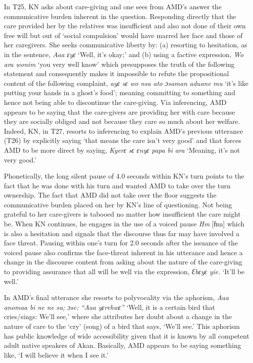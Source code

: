 \documentclass[output=paper,colorlinks,citecolor=brown]{langscibook}
\begin{document}
In T25, KN asks about care-giving and one sees from AMD’s answer the communicative burden inherent in the question. Responding directly that the care provided her by the relatives was insufficient and also not done of their own free will but out of ‘social compulsion’ would have marred her face and those of her caregivers. She seeks communicative liberty by: (a) resorting to hesitation, as in the sentence, \textit{Aaa ɛyɛ} ‘Well, it’s okay;’ and (b) using a factive expression, \textit{Wo ara wonim} ‘you very well know’ which presupposes the truth of the following statement and consequently makes it impossible to refute the propositional content of the following complaint, \textit{ayɛ sɛ wo nsa ato ɔsaman aduane mu} ‘it’s like putting your hands in a ghost’s food'; meaning committing to something and hence not being able to discontinue the care-giving. Via inferencing, AMD appears to be saying that the care-givers are providing her with care because they are socially obliged and not because they care so much about her welfare. Indeed, KN, in T27, resorts to inferencing to explain AMD’s previous utterance (T26) by explicitly saying ‘that means the care isn’t very good’ and that forces AMD to be more direct by saying, \textit{Kyerɛ sɛ ɛnyɛ papa bi ara} ‘Meaning, it’s not very good.’ 

Phonetically, the long silent pause of 4.0 seconds within KN’s turn points to the fact that he was done with his turn and wanted AMD to take over the turn ownership. The fact that AMD did not take over the floor suggests the communicative burden placed on her by KN’s line of questioning. Not being grateful to her care-givers is tabooed no matter how insufficient the care might be. When KN continues, he engages in the use of a voiced pause \textit{Hm} [ɦm] which is also a hesitation and signals that the discourse thus far may have involved a face threat. Pausing within one’s turn for 2.0 seconds after the issuance of the voiced pause also confirms the face-threat inherent in his utterance and hence a change in the discourse content from asking about the nature of the care-giving to providing assurance that all will be well via the expression, \textit{Ɛbɛyɛ yie.} ‘It’ll be well.’

In AMD’s final utterance she resorts to polyvocality via the aphorism, \textit{Aaa anomaa bi ne ne su; ɔse: “Aaa yɛrehwɛ”} ‘Well, it is a certain bird that cries/sings: We’ll see,’ where she attributes her doubt about a change in the nature of care to the ‘cry’ (song) of a bird that says, ‘We’ll see.’ This aphorism has public knowledge of wide accessibility given that it is known by all competent adult native speakers of Akan. Basically, AMD appears to be saying something like, ‘I will believe it when I see it.’
\end{document}
